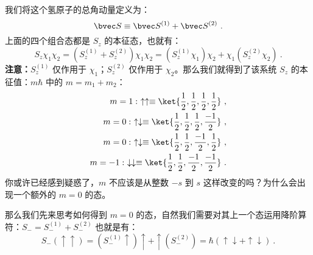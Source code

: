 我们将这个氢原子的总角动量定义为：
\begin{equation}
\bvec S \equiv \bvec S^{(1)}+\bvec S^{(2)}~.
\end{equation}
上面的四个组合态都是 $S_z$ 的本征态，也就有：
\begin{equation}
S_z\chi_1\chi_2=(S_z^{(1)}+S_z^{(2)})\chi_1\chi_2=(S_z^{(1)}\chi_1)\chi_2+\chi_1(S_z^{(2)}\chi_2)~.
\end{equation}
\textbf{注意：}$S_z^{(1)}$ 仅作用于 $\chi_1$；$S_z^{(2)}$ 仅作用于 $\chi_2$。那么我们就得到了该系统 $S_z$ 的本征值：$m\hbar$ 中的 $m=m_1+m_2$：
\begin{align}
m=1: \ \uparrow\uparrow\equiv \ket{\frac{1}{2},\frac{1}{2},\frac{1}{2},\frac{1}{2}}~,\\
m=0: \ \uparrow\downarrow\equiv \ket{\frac{1}{2},\frac{1}{2},\frac{1}{2},\frac{-1}{2}}~,\\
m=0: \ \uparrow\downarrow\equiv \ket{\frac{1}{2},\frac{1}{2},\frac{-1}{2},\frac{1}{2}}~,\\ 
m=-1:\ \downarrow\downarrow\equiv \ket{\frac{1}{2},\frac{1}{2},\frac{-1}{2},\frac{-1}{2}}~.
\end{align}
你或许已经感到疑惑了，$m$ 不应该是从整数 $-s$ 到 $s$ 这样改变的吗？为什么会出现一个额外的 $m=0$ 的态。

那么我们先来思考如何得到 $m=0$ 的态，自然我们需要对其上一个态运用降阶算符：$S_-=S_-^{(1)}+S_-^{(2)}$ 也就是有：
\begin{equation}
S_-(\uparrow\uparrow)=(S_-^{(1)}\uparrow)\uparrow+\uparrow(S_-^{(2)})=\hbar(\uparrow\downarrow+\uparrow\downarrow)~.
\end{equation}

